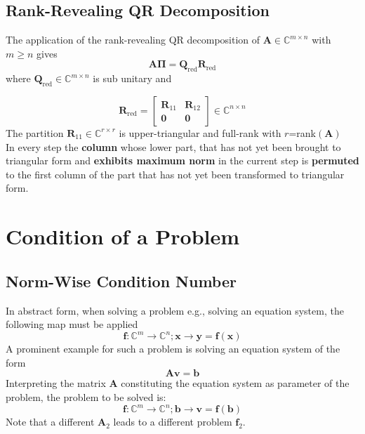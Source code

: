 \documentclass[english]{latex4ei/latex4ei_sheet}
\begin{document}
\begin{sectionbox}
\subsection{Rank-Revealing QR Decomposition}
The application of the rank-revealing QR decomposition of $\mathbf{A}\in\mathbb{C}^{m\times n}$ with $m\geq n$ gives
$$\mathbf{A}\mathbf{\Pi} = \mathbf{Q}_\text{red} \mathbf{R}_\text{red}$$
where $\mathbf{Q}_\text{red}\in\mathbb{C}^{m\times n}$ is sub unitary and

$$\mathbf{R}_\text{red} = \begin{bmatrix}
\mathbf{R}_{11} & \mathbf{R}_{12}\\
\mathbf{0} & \mathbf{0}
\end{bmatrix}\in\mathbb{C}^{n\times n}$$
The partition $\mathbf{R}_{11}\in \mathbb{C}^{r\times r}$ is upper-triangular and full-rank with $r$=rank$(\mathbf{A})$\\
In every step the \textbf{column} whose lower part, that has not yet been brought to triangular form and \textbf{exhibits maximum norm} in the current step is \textbf{permuted} to the first column of the part that has not yet been transformed to triangular form.
\end{sectionbox}
\section{Condition of a Problem}
\begin{sectionbox}
\subsection{Norm-Wise Condition Number}
In abstract form, when solving a problem e.g., solving an equation system, the following map must be applied
$$\mathbf{f}:\mathbb{C}^m \to \mathbb{C}^n; \mathbf{x}\to\mathbf{y}=\mathbf{f}(\mathbf{x})$$
A prominent example for such a problem is solving an equation system of the form
$$\mathbf{A}\mathbf{v} = \mathbf{b}$$
Interpreting the matrix $\mathbf{A}$ constituting the equation system as parameter of the problem, the problem to be solved is:
$$\mathbf{f}:\mathbb{C}^m \to \mathbb{C}^n; \mathbf{b}\to\mathbf{v}=\mathbf{f}(\mathbf{b})$$
Note that a different $\mathbf{A}_2$ leads to a different problem $\mathbf{f}_2$.
\end{sectionbox}
\end{document}
